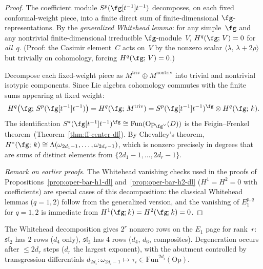 \begin{proof}
The coefficient module $S^p(\fg[t^{-1}]t^{-1})$ decomposes, on each
fixed conformal-weight piece, into a finite direct sum of
finite-dimensional $\fg$-representations. By the
\emph{generalized Whitehead lemma}: for any simple~$\fg$ and any
nontrivial finite-dimensional irreducible $\fg$-module~$V$,
$H^q(\fg;\, V) = 0$ for \emph{all}~$q$. \textup{(}Proof: the
Casimir element~$C$ acts on~$V$ by the nonzero scalar
$\langle \lambda,\, \lambda + 2\rho\rangle$ but trivially on
cohomology, forcing $H^q(\fg;\, V) = 0$.\textup{)}

Decompose each fixed-weight piece as
$M^{\mathrm{triv}} \oplus M^{\mathrm{nontriv}}$
into trivial and nontrivial isotypic components. Since Lie
algebra cohomology commutes with the finite sums appearing at fixed
weight:
\[
H^q\bigl(\fg;\, S^p(\fg[t^{-1}]t^{-1})\bigr)
= H^q(\fg;\, M^{\mathrm{triv}})
= S^p(\fg[t^{-1}]t^{-1})^{\fg} \otimes H^q(\fg;\, k).
\]
The identification
$S^*(\fg[t^{-1}]t^{-1})^{\fg}
\cong \mathrm{Fun}(\mathrm{Op}_{\fg^\vee}(D))$
is the Feigin--Frenkel theorem~\textup{(}Theorem~\ref{thm:ff-center-dl}\textup{)}.
By Chevalley's theorem,
$H^*(\fg;\, k) \cong
\Lambda(\omega_{2d_1-1}, \ldots, \omega_{2d_r-1})$, which is
nonzero precisely in degrees that are sums of distinct elements
from $\{2d_1 - 1, \ldots, 2d_r - 1\}$.

\emph{Remark on earlier proofs.}
The Whitehead vanishing checks used in the proofs of
Propositions~\ref{prop:oper-bar-h1-dl}
and~\ref{prop:oper-bar-h2-dl} ($H^1 = H^2 = 0$ with
coefficients) are special cases of this decomposition: the
classical Whitehead lemmas ($q = 1, 2$) follow from the
generalized version, and the vanishing of $E_1^{p,q}$ for
$q = 1, 2$ is immediate from $H^1(\fg; k) = H^2(\fg; k) = 0$.
\end{proof}

\begin{remark}
\label{rem:spectral-by-rank}
The Whitehead decomposition gives $2^r$ nonzero rows on the $E_1$
page for rank~$r$: $\mathfrak{sl}_2$ has $2$ rows ($d_4$ only),
$\mathfrak{sl}_3$ has $4$ rows ($d_4$, $d_6$, composites).
Degeneration occurs after $\leq 2d_r$ steps ($d_r$ the largest
exponent), with the abutment controlled by transgression
differentials
$d_{2d_i}\colon \omega_{2d_i-1} \mapsto \tau_i \in
\mathrm{Fun}^{2d_i}(\mathrm{Op})$.
\end{remark}


